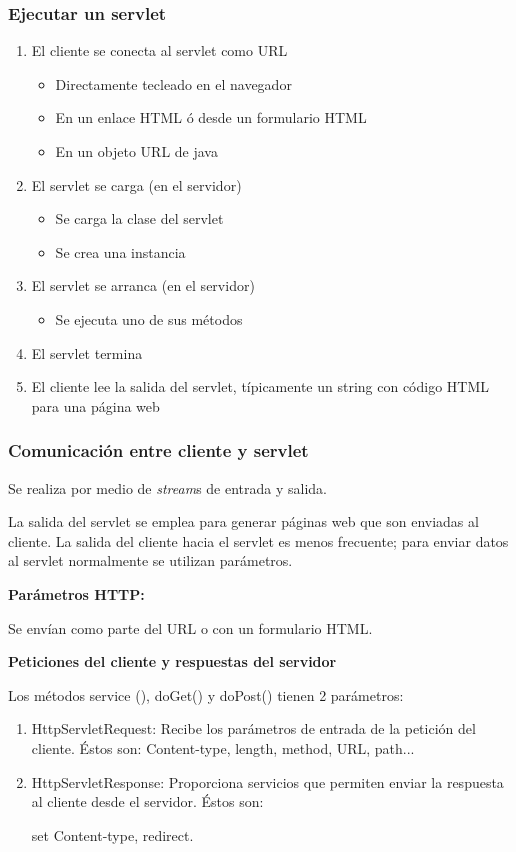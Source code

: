 \documentclass{apuntes}
\begin{document}
\subsubsection{Ejecutar un servlet}
\begin{enumerate}
\item El cliente se conecta al servlet como URL
\begin{itemize}
\item Directamente tecleado en el navegador
\item En un enlace HTML ó desde un formulario HTML
\item En un objeto URL de java
\end{itemize}
\item El servlet se carga (en el servidor)
\begin{itemize}
\item Se carga la clase del servlet
\item Se crea una instancia
\end{itemize}
\item El servlet se arranca (en el servidor)
\begin{itemize}
\item Se ejecuta uno de sus métodos
\end{itemize}
\item El servlet termina
\item El cliente lee la salida del servlet, típicamente un string con código HTML para una página web
\end{enumerate}

\subsubsection{Comunicación entre cliente y servlet}
Se realiza por medio de \emph{stream}s de entrada y salida.

La salida del servlet se emplea para generar páginas web que son enviadas al cliente. La salida del cliente hacia el servlet es menos frecuente; para enviar datos al servlet normalmente se utilizan parámetros.

\textbf{Parámetros HTTP:}

Se envían como parte del URL o con un formulario HTML.

\textbf{Peticiones del cliente y respuestas del servidor}

Los métodos service (), doGet() y doPost() tienen 2 parámetros:

\begin{enumerate}
\item HttpServletRequest:
Recibe los parámetros de entrada de la petición del cliente. Éstos son:
Content-type, length, method, URL, path...

\item HttpServletResponse:
Proporciona servicios que permiten enviar la respuesta al cliente desde el servidor. Éstos son:

set Content-type, redirect.
\end{enumerate}
\end{document}
